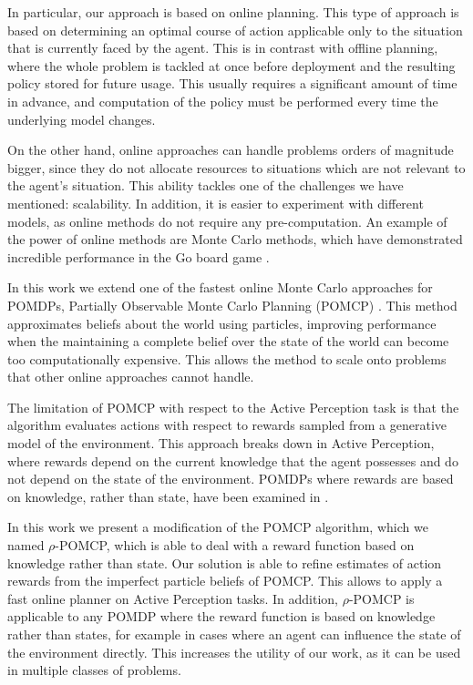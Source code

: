 In particular, our approach is based on online planning. This type of approach is based on
determining an optimal course of action applicable only to the situation that is currently faced by
the agent. This is in contrast with offline planning, where the whole problem is tackled at once
before deployment and the resulting policy stored for future usage. This usually requires a
significant amount of time in advance, and computation of the policy must be performed every time
the underlying model changes.

On the other hand, online approaches can handle problems orders of magnitude bigger, since they do
not allocate resources to situations which are not relevant to the agent's situation. This ability
tackles one of the challenges we have mentioned: scalability. In addition, it is easier to
experiment with different models, as online methods do not require any pre-computation. An example
of the power of online methods are Monte Carlo methods, which have demonstrated incredible
performance in the Go board game \cite{cit:mcts}.

In this work we extend one of the fastest online Monte Carlo approaches for POMDPs, Partially
Observable Monte Carlo Planning (POMCP) \cite{cit:pomcp}. This method approximates beliefs about the
world using particles, improving performance when the maintaining a complete belief over the state
of the world can become too computationally expensive. This allows the method to scale onto problems
that other online approaches cannot handle.

The limitation of POMCP with respect to the Active Perception task is that the algorithm evaluates
actions with respect to rewards sampled from a generative model of the environment. This approach
breaks down in Active Perception, where rewards depend on the current knowledge that the agent
possesses and do not depend on the state of the environment. POMDPs where rewards are based on
knowledge, rather than state, have been examined in \cite{cit:rpomdp}.

In this work we present a modification of the POMCP algorithm, which we named $\rho$-POMCP, which is
able to deal with a reward function based on knowledge rather than state. Our solution is able to
refine estimates of action rewards from the imperfect particle beliefs of POMCP. This allows to
apply a fast online planner on Active Perception tasks. In addition, $\rho$-POMCP is applicable to
any POMDP where the reward function is based on knowledge rather than states, for example in cases
where an agent can influence the state of the environment directly. This increases the utility of
our work, as it can be used in multiple classes of problems.


